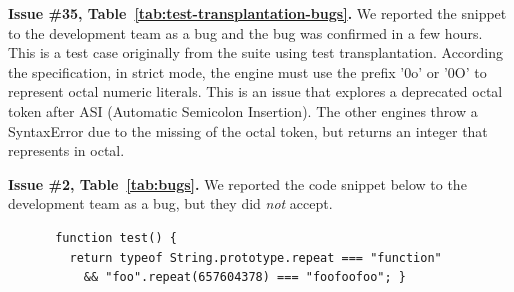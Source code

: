 \documentclass[smallextended]{svjour3}
\begin{document}
\vspace{1ex}\noindent\textbf{Issue \#35, Table~\ref{tab:test-transplantation-bugs}.} We
reported the snippet  to the
\textbf{\smonkey} development team as a bug and the bug was confirmed
in a few hours.  This is a test case originally from the \hermes suite
using test transplantation.  According the specification, in strict
mode, the engine must use the prefix '0o' or '0O' to represent octal
numeric literals. This is an issue that explores a deprecated octal
token after ASI (Automatic Semicolon Insertion). The other engines
throw a SyntaxError due to the missing of the octal token, but \smonkey
returns an integer  that represents  in octal.





\vspace{1ex}\noindent\textbf{Issue \#2, Table~\ref{tab:bugs}.} We
reported the code snippet below to the \textbf{\chakra} development team as a
bug, but they did \emph{not} accept.

\begin{figure}[h!]
  \vspace{-0.5ex}
  \centering
  \scriptsize
  \begin{lstlisting}
 function test() {
   return typeof String.prototype.repeat === "function"
     && "foo".repeat(657604378) === "foofoofoo"; }
  \end{lstlisting}
  \normalsize
  \vspace{-1ex}
\end{figure}
\end{document}
